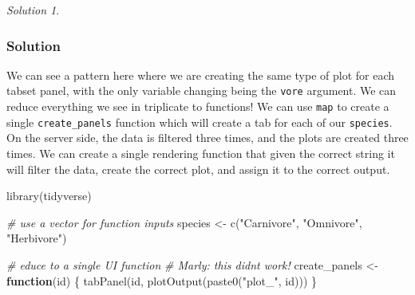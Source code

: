 \documentclass[
]{book}
\newenvironment{Shaded}{\begin{snugshade}}{\end{snugshade}}
\newcommand{\CommentTok}[1]{\textcolor[rgb]{0.56,0.35,0.01}{\textit{#1}}}
\newcommand{\ControlFlowTok}[1]{\textcolor[rgb]{0.13,0.29,0.53}{\textbf{#1}}}
\newcommand{\FunctionTok}[1]{\textcolor[rgb]{0.00,0.00,0.00}{#1}}
\newcommand{\NormalTok}[1]{#1}
\newcommand{\OtherTok}[1]{\textcolor[rgb]{0.56,0.35,0.01}{#1}}
\newcommand{\StringTok}[1]{\textcolor[rgb]{0.31,0.60,0.02}{#1}}
\theoremstyle{definition}
\theoremstyle{definition}
\theoremstyle{definition}
\theoremstyle{definition}
\theoremstyle{remark}
\newtheorem*{solution}{Solution}
\begin{document}
\begin{solution}
\leavevmode

\hypertarget{solution-43}{%
\subsubsection*{Solution}\label{solution-43}}

We can see a pattern here where we are creating the same type of plot for each tabset panel, with the only variable changing being the \texttt{vore} argument. We can reduce everything we see in triplicate to functions! We can use \texttt{map} to create a single \texttt{create\_panels} function which will create a tab for each of our \texttt{species}. On the server side, the data is filtered three times, and the plots are created three times. We can create a single rendering function that given the correct string it will filter the data, create the correct plot, and assign it to the correct output.

\begin{Shaded}
\begin{Highlighting}[]
\FunctionTok{library}\NormalTok{(tidyverse)}

\CommentTok{\# use a vector for function inputs}
\NormalTok{species }\OtherTok{\textless{}{-}} \FunctionTok{c}\NormalTok{(}\StringTok{"Carnivore"}\NormalTok{, }\StringTok{"Omnivore"}\NormalTok{, }\StringTok{"Herbivore"}\NormalTok{)}

\CommentTok{\# educe to a single UI function}
\CommentTok{\# Marly: this didn\textquotesingle{}t work!}
\NormalTok{create\_panels }\OtherTok{\textless{}{-}} \ControlFlowTok{function}\NormalTok{(id) \{}
    \FunctionTok{tabPanel}\NormalTok{(id, }\FunctionTok{plotOutput}\NormalTok{(}\FunctionTok{paste0}\NormalTok{(}\StringTok{"plot\_"}\NormalTok{, id)))}
\NormalTok{\}}


\end{Highlighting}
\end{Shaded}
\end{solution}
\end{document}
